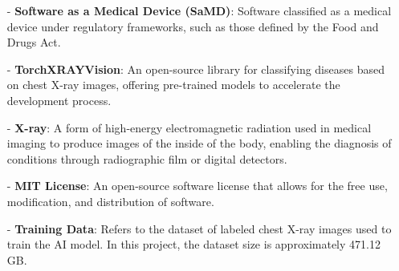 \documentclass[12pt]{article}
\begin{document}
\begin{itemize}
    \item[-] \textbf{Software as a Medical Device (SaMD)}: Software classified as a medical device under regulatory frameworks, such as those defined by the Food and Drugs Act.
    
    \item[-] \textbf{TorchXRAYVision}: An open-source library for classifying diseases based on chest X-ray images, offering pre-trained models to accelerate the development process.
    
    \item[-] \textbf{X-ray}: A form of high-energy electromagnetic radiation used in medical imaging to produce images of the inside of the body, enabling the diagnosis of conditions through radiographic film or digital detectors.
    
    \item[-] \textbf{MIT License}: An open-source software license that allows for the free use, modification, and distribution of software.
    
    \item[-] \textbf{Training Data}: Refers to the dataset of labeled chest X-ray images used to train the AI model. In this project, the dataset size is approximately 471.12 GB.
    
\end{itemize}
\end{document}

